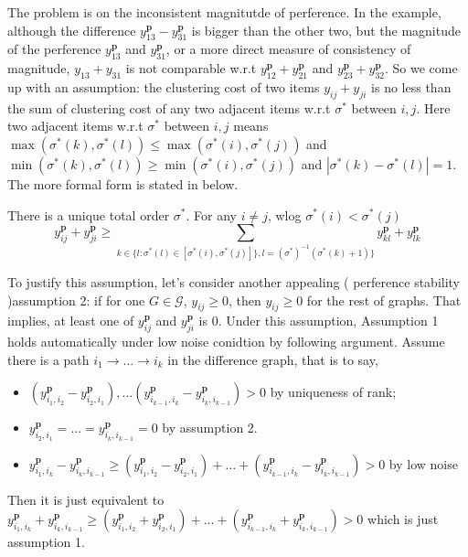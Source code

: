 The problem is on the inconsistent magnitutde of perference. In the example, although the difference $y_{13}^\mathbf{p}-y_{31}^\mathbf{p}$ is bigger than the other two, but the magnitude of the perference $y_{13}^\mathbf{p}$ and $y_{31}^\mathbf{p}$, or a more direct measure of consistency of magnitude, $y_{13}+y_{31}$ is not comparable w.r.t $y_{12}^\mathbf{p}+y_{21}^\mathbf{p}$ and $y_{23}^\mathbf{p}+y_{32}^\mathbf{p}$.  So we come up with an assumption:  the clustering cost of two items $y_{ij}+y_{ji}$ is no less than the sum of clustering cost of any two adjacent items w.r.t $\sigma^*$ between $i,j$. Here two adjacent items w.r.t $\sigma^*$ between $i,j$ means $\max(\sigma^*(k),\sigma^*(l))\leq  \max(\sigma^*(i),\sigma^*(j))$ and $\min(\sigma^*(k),\sigma^*(l))\geq  \min(\sigma^*(i),\sigma^*(j))$ and $|\sigma^*(k)-\sigma^*(l)|=1$. The more formal form is stated in below.

\begin{assumption}
	There is a unique total order $\sigma^*$. For any  $i\not=j $, wlog $\sigma^*(i)<\sigma^*(j)$
	$$y_{ij}^\mathbf{p}+y_{ji}^\mathbf{p}\geq \sum\limits_{k\in \{l: \sigma^*(l)\in [\sigma^*(i), \sigma^*(j)]\}, l={(\sigma^*)}^{-1}(\sigma^*(k)+1)\}}y_{kl}^\mathbf{p}+y_{lk}^\mathbf{p}$$
\end{assumption}


To justify this assumption, let's consider another appealing ( perference stability )assumption 2: if for one $G\in \mathcal{G}$, $y_{ij}\geq 0$, then $y_{ij}\geq0$ for the rest of graphs. That implies, at least one of $y_{ij}^\mathbf{p}$ and $y_{ji}^\mathbf{p}$ is $0$.  Under this assumption,  Assumption 1 holds automatically under low noise conidtion by following argument. Assume there is a path $i_1\rightarrow...\rightarrow i_k$ in the difference graph, that is to say,
\begin{itemize}
	\item $(y_{i_1,i_2}^\mathbf{p}-y_{i_2,i_1}^\mathbf{p}),...(y_{i_{k-1},i_k}^\mathbf{p}-y_{i_{k}, i_{k-1}}^\mathbf{p})>0$ by uniqueness of rank;
	\item $y_{i_2,i_1}^\mathbf{p} = ... =y_{i_{k}, i_{k-1}}^\mathbf{p} = 0$ by assumption 2.
	\item  $y_{i_1, i_k}^\mathbf{p}-y_{i_k,i_{k-1}}^\mathbf{p}\geq (y_{i_1,i_2}^\mathbf{p}-y_{i_2,i_1}^\mathbf{p})+...+(y_{i_{k-1},i_k}^\mathbf{p}-y_{i_{k}, i_{k-1}}^\mathbf{p})>0$ by low noise
\end{itemize} Then it is just equivalent to  
$y_{i_1, i_k}^\mathbf{p}+y_{i_k,i_{k-1}}^\mathbf{p}\geq (y_{i_1,i_2}^\mathbf{p}+y_{i_2,i_1}^\mathbf{p})+...+(y_{i_{k-1},i_k}^\mathbf{p}+y_{i_{k}, i_{k-1}}^\mathbf{p})>0$
which is just assumption 1. 


